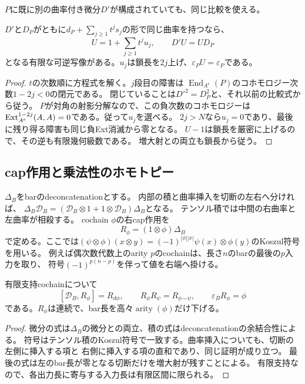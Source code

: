 $P$に既に別の曲率付き微分$D'$が構成されていても、同じ比較を使える。
\begin{lemma}[有限曲率化の選択独立性]\label{mb:lem:uniqueness}
$D'$と$D_P$がともに$d_P+\sum_{j\ge1}t^js_j$の形で同じ曲率を持つなら、
\[
 U=1+\sum_{j\ge1}t^j u_j,\qquad D'U=UD_P
\]
となる有限な可逆写像がある。$u_j$は鎖長を$2j$上げ、$\varepsilon_PU=\varepsilon_P$である。
\end{lemma}
\begin{proof}
$t$の次数順に方程式を解く。$j$段目の障害は
$\operatorname{End}_{A^e}(P)$のコホモロジー次数$1-2j<0$の閉元である。
閉じていることは$D'^2=D_P^2$と、それ以前の比較式から従う。
$P$が対角の射影分解なので、この負次数のコホモロジーは
$\operatorname{Ext}^{1-2j}_{A^e}(A,A)=0$である。従って$u_j$を選べる。
$2j>N$なら$u_j=0$であり、最後に残り得る障害も同じ負Ext消滅から零となる。
$U-1$は鎖長を厳密に上げるので、その逆も有限幾何級数である。
増大射との両立も鎖長から従う。
\end{proof}

\subsection{cap作用と乗法性のホモトピー}
$\Delta_B$をbarのdeconcatenationとする。
内部の積と曲率挿入を切断の左右へ分ければ、
$\Delta_B\mathcal D_B=(\mathcal D_B\otimes1+1\otimes\mathcal D_B)\Delta_B$となる。
テンソル積では中間の右曲率と左曲率が相殺する。
cochain $\phi$の右cap作用を
\[
 R_\phi=(1\otimes\phi)\Delta_B
\]
で定める。ここでは$(\psi\otimes\phi)(x\otimes y)=
(-1)^{|\phi||x|}\psi(x)\otimes\phi(y)$のKoszul符号を用いる。
例えば偶次数代数上のarity $p$のcochainは、長さ$n$のbarの最後の$p$入力を取り、
符号$(-1)^{p(n-p)}$を伴って値を右端へ掛ける。

\begin{lemma}[曲率付きcap恒等式]\label{mb:lem:cap}
有限支持cochainについて
\[
 [\mathcal D_B,R_\phi]=R_{d\phi},\qquad
 R_\phi R_\psi=R_{\phi\smile\psi},\qquad
 \varepsilon_BR_\phi=\phi
\]
である。$R_\phi$は連続で、bar長を高々$\operatorname{arity}(\phi)$だけ下げる。
\end{lemma}
\begin{proof}
微分の式は$\Delta_B$の微分との両立、積の式はdeconcatenationの余結合性による。
符号はテンソル積のKoszul符号で一致する。曲率挿入についても、切断の左側に挿入する項と
右側に挿入する項の直和であり、同じ証明が成り立つ。
最後の式は左のbar長が零となる切断だけを増大射が残すことによる。
有限支持なので、各出力長に寄与する入力長は有限区間に限られる。
\end{proof}


